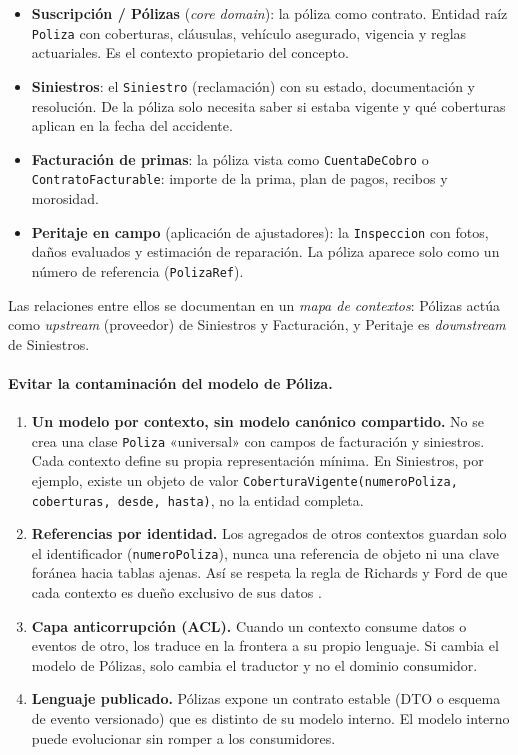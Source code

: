 \begin{itemize}
  \item \textbf{Suscripción / Pólizas} (\emph{core domain}): la póliza como contrato. Entidad
        raíz \texttt{Poliza} con coberturas, cláusulas, vehículo asegurado, vigencia y reglas
        actuariales. Es el contexto propietario del concepto.
  \item \textbf{Siniestros}: el \texttt{Siniestro} (reclamación) con su estado, documentación
        y resolución. De la póliza solo necesita saber si estaba vigente y qué coberturas
        aplican en la fecha del accidente.
  \item \textbf{Facturación de primas}: la póliza vista como \texttt{CuentaDeCobro} o
        \texttt{Contrato\-Facturable}: importe de la prima, plan de pagos, recibos y morosidad.
  \item \textbf{Peritaje en campo} (aplicación de ajustadores): la \texttt{Inspeccion} con
        fotos, daños evaluados y estimación de reparación. La póliza aparece solo como un
        número de referencia (\texttt{PolizaRef}).
\end{itemize}

Las relaciones entre ellos se documentan en un \emph{mapa de contextos}: Pólizas actúa como
\emph{upstream} (proveedor) de Siniestros y Facturación, y Peritaje es \emph{downstream} de
Siniestros.

\paragraph{Evitar la contaminación del modelo de Póliza.}
\begin{enumerate}
  \item \textbf{Un modelo por contexto, sin modelo canónico compartido.} No se crea una clase
        \texttt{Poliza} «universal» con campos de facturación y siniestros. Cada contexto
        define su propia representación mínima. En Siniestros, por ejemplo, existe un objeto
        de valor \texttt{CoberturaVigente(numeroPoliza, coberturas, desde, hasta)}, no la
        entidad completa.
  \item \textbf{Referencias por identidad.} Los agregados de otros contextos guardan solo el
        identificador (\texttt{numeroPoliza}), nunca una referencia de objeto ni una clave
        foránea hacia tablas ajenas. Así se respeta la regla de Richards y Ford de que cada
        contexto es dueño exclusivo de sus datos \parencite{richards2020fundamentals}.
  \item \textbf{Capa anticorrupción (ACL).} Cuando un contexto consume datos o eventos de
        otro, los traduce en la frontera a su propio lenguaje. Si cambia el modelo de Pólizas,
        solo cambia el traductor y no el dominio consumidor.
  \item \textbf{Lenguaje publicado.} Pólizas expone un contrato estable (DTO o esquema de
        evento versionado) que es distinto de su modelo interno. El modelo interno puede
        evolucionar sin romper a los consumidores.
\end{enumerate}

